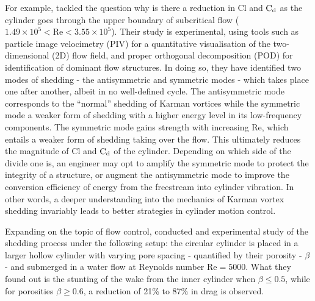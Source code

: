 \documentclass[oneside]{utmthesis}
\begin{document}
For example, \citet{Desai2020} tackled the question why is there a reduction in Cl and $\text{C}_{\text{d}}$ as the cylinder goes through the upper boundary of subcritical flow ($1.49 \times 10^{5} < \text{Re} < 3.55 \times 10^{5}$). Their study is experimental, using tools such as particle image velocimetry (PIV) for a quantitative visualisation of the two-dimensional (2D) flow field, and proper orthogonal decomposition (POD) for identification of dominant flow structures. In doing so, they have identified two modes of shedding - the antisymmetric and symmetric modes - which takes place one after another, albeit in no well-defined cycle. The antisymmetric mode corresponds to the ``normal'' shedding of Karman vortices while the symmetric mode a weaker form of shedding with a higher energy level in its low-frequency components. The symmetric mode gains strength with increasing Re, which entails a weaker form of shedding taking over the flow. This ultimately reduces the magnitude of Cl and $\text{C}_{\text{d}}$ of the cylinder. Depending on which side of the divide one is, an engineer may opt to amplify the symmetric mode to protect the integrity of a structure, or augment the antisymmetric mode to improve the conversion efficiency of energy from the freestream into cylinder vibration. In other words, a deeper understanding into the mechanics of Karman vortex shedding invariably leads to better strategies in cylinder motion control.

Expanding on the topic of flow control, \citet{Durhasan2019} conducted and experimental study of the shedding process under the following setup: the circular cylinder is placed in a larger hollow cylinder with varying pore spacing - quantified by their porosity - $\beta$ - and submerged in a water flow at Reynolds number $\text{Re} = 5000$. What they found out is the stunting of the wake from the inner cylinder when $\beta \leq 0.5$, while for porosities $\beta \geq 0.6$, a reduction of 21\% to 87\% in drag is observed.
\end{document}

